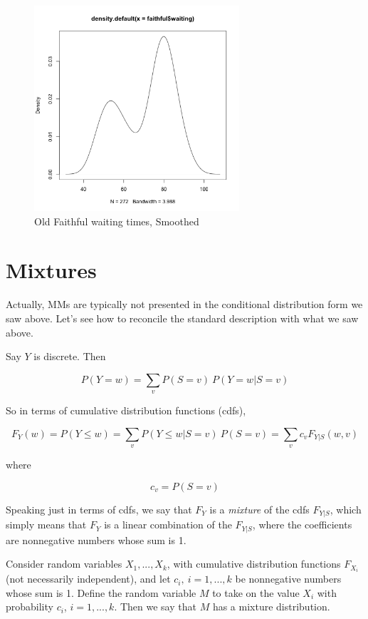 \documentclass[11pt]{article}
\begin{document}
\begin{figure}[tb]
\centerline{
\includegraphics[width=3.0in]{FaithfulSmooth.png}
}
\caption{Old Faithful waiting times, Smoothed}
\label{faithfulhistsmooth}
\end{figure}

\section{Mixtures}

Actually, MMs are typically not presented in the conditional distribution
form we saw above.  Let's see how to reconcile the standard description
with what we saw above.

Say $Y$ is discrete.  Then

\begin{equation}
P(Y = w) = \sum_{v} P(S = v) ~ P(Y = w | S = v)
\end{equation}

So in terms of cumulative distribution functions (cdfs),

\begin{equation}
F_Y(w) = P(Y \leq w) = 
\sum_{v} P(Y \leq w | S = v) ~ P(S = v) =
\sum_{v} c_v F_{Y|S}(w,v)
\end{equation}

where 

\begin{equation}
c_v = P(S = v)
\end{equation}

Speaking just in terms of cdfs, we say that $F_Y$ is a \textit{mixture}
of the cdfs $F_{Y|S}$, which simply means that $F_Y$ is a linear
combination of the $F_{Y|S}$, where the coefficients are nonnegative
numbers whose sum is 1.



Consider random variables $X_1,...,X_k$, with cumulative distribution
functions $F_{X_i}$ (not necessarily independent), and let $c_i, ~
i=1,...,k$ be nonnegative numbers whose sum is 1.  Define the random
variable $M$ to take on the value $X_i$ with probability $c_i$,
$i=1,...,k$.  Then we say that $M$ has a mixture distribution.
\end{document}
